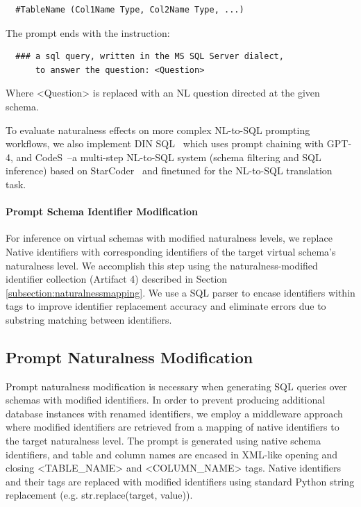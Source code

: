 \begin{verbatim}
  #TableName (Col1Name Type, Col2Name Type, ...)
\end{verbatim}

The prompt ends with the instruction:

\begin{verbatim}
  ### a sql query, written in the MS SQL Server dialect, 
      to answer the question: <Question>
\end{verbatim}

Where <Question> is replaced with an NL question directed at the given schema.

To evaluate naturalness effects on more complex NL-to-SQL prompting workflows, we also implement DIN SQL~\cite{pourreza2023dinsql} which uses prompt chaining with GPT-4, and CodeS~\cite{10.1145/3654930}--a multi-step NL-to-SQL system (schema filtering and SQL inference) based on StarCoder~\cite{li2023starcoder} and finetuned for the NL-to-SQL translation task.

\paragraph{\textbf{Prompt Schema Identifier Modification}}
For inference on virtual schemas with modified naturalness levels, we replace Native identifiers with corresponding identifiers of the target virtual schema's naturalness level.
We accomplish this step using the naturalness-modified identifier collection (Artifact 4) described in Section \ref{subsection:naturalnessmapping}.
We use a SQL parser to encase identifiers within tags to improve identifier replacement accuracy and eliminate errors due to substring matching between identifiers.


\subsection{Prompt Naturalness Modification}

Prompt naturalness modification is necessary when generating SQL queries over schemas with modified identifiers.
In order to prevent producing additional database instances with renamed identifiers, we employ a middleware approach where modified identifiers are retrieved from a mapping of native identifiers to the target naturalness level.
The prompt is generated using native schema identifiers, and table and column names are encased in XML-like opening and closing <TABLE\_NAME> and <COLUMN\_NAME> tags.
Native identifiers and their tags are replaced with modified identifiers using standard Python string replacement (e.g. str.replace(target, value)).

